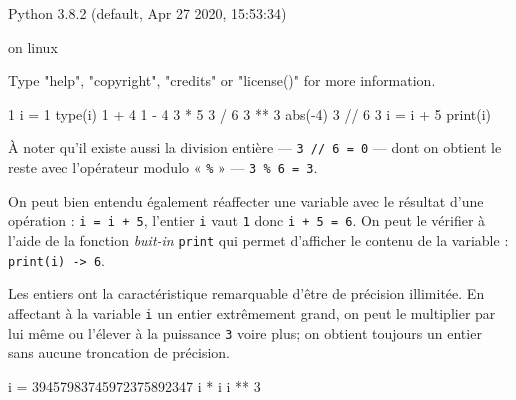 \begin{idleshell*}[before skip=8pt, after skip=8pt]
Python 3.8.2 (default, Apr 27 2020, 15:53:34)\par
[GCC 9.3.0] on linux\par
Type "help", "copyright", "credits" or "license()" for more information.
\begin{pyconsole}
1
i = 1
type(i)
1 + 4
1 - 4
3 * 5
3 / 6
3 ** 3
abs(-4)
3 // 6
3 %
i = i + 5
print(i)
\end{pyconsole}
\end{idleshell*}

À noter qu'il existe aussi la division entière  --- \texttt{3 // 6 = 0} --- dont on obtient le reste avec l'opérateur modulo « \texttt{\%} » --- \texttt{3 \% 6 = 3}.

On peut bien entendu également réaffecter une variable avec le résultat d'une opération : \texttt{i = i + 5}, l'entier \texttt{i} vaut \texttt{1} donc \texttt{i + 5 = 6}. On peut le vérifier à l'aide de la fonction \textit{buit-in} \texttt{print} qui permet d'afficher le contenu de la variable : \texttt{print(i) -> 6}.




Les entiers ont la caractéristique remarquable d'être de précision illimitée. En affectant à la variable \texttt{i} un entier extrêmement grand, on peut le multiplier par lui même ou l’élever à la puissance \texttt{3} voire plus; on obtient toujours un entier sans aucune troncation de précision.

\begin{idleconsole}
	\begin{pyconsole}
		i = 39457983745972375892347
		i * i
		i ** 3
	\end{pyconsole}
\end{idleconsole}

\vspace{2pt}

